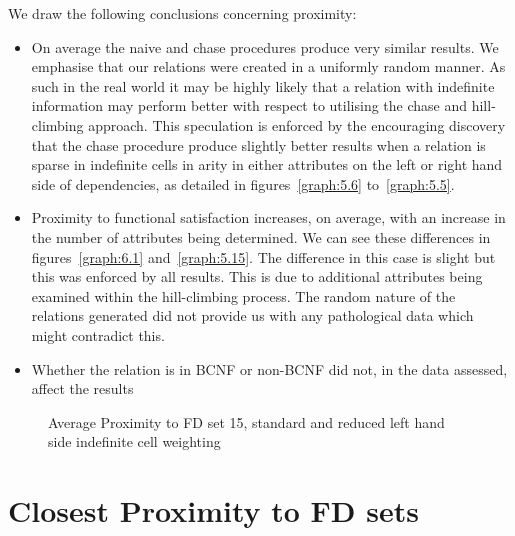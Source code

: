 {We draw the following conclusions concerning proximity:
\begin{itemize}
\item On average the naive and chase procedures produce very similar
results. We emphasise that our relations were created in a uniformly
random manner. As such in the real world it may be highly likely that
a relation with indefinite information may perform better with respect
to utilising the chase and hill-climbing approach. This speculation is
enforced by the encouraging discovery that the chase procedure produce
slightly better results when a relation is sparse in indefinite cells
in arity in either attributes on the left or right hand side of
dependencies, as detailed in figures~\ref{graph:5.6}
to~\ref{graph:5.5}. 
\item Proximity to functional satisfaction increases, on average, with
an increase in the number of attributes being determined. We can see
these differences in figures~\ref{graph:6.1} and~\ref{graph:5.15}. The
difference in this case is slight but this was enforced by all
results. This is due to additional attributes being examined within
the hill-climbing process. The random nature of the relations
generated did not provide us with any pathological data
which might contradict this.
\item Whether the relation is in BCNF or non-BCNF did not, in the
data assessed, affect the results
\end{itemize}


\begin{figure}
\begin{minipage}{7cm}
\centerline{}
\caption{\label{graph:5.6} {Average Proximity to FD set 15, standard
and reduced
right hand side indefinite cell weighting}}
\end{minipage}
\hfill
\begin{minipage}{7cm}
\centerline{}
\caption{\label{graph:5.7} {Average Proximity to FD set 15, standard
and reduced
left hand side indefinite cell weighting}}
\end{minipage}
\end{figure}



\section{Closest Proximity to FD sets}

}
